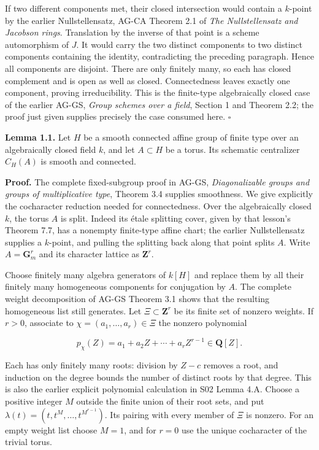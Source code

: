\documentclass[11pt,a4paper,openany]{report}
\newcounter{none}
\begin{document}
If two different components met, their closed intersection would contain a \(k\)-point by the earlier Nullstellensatz, AG-CA Theorem 2.1 of \emph{The Nullstellensatz and Jacobson rings}. Translation by the inverse of that point is a scheme automorphism of \(J\). It would carry the two distinct components to two distinct components containing the identity, contradicting the preceding paragraph. Hence all components are disjoint. There are only finitely many, so each has closed complement and is open as well as closed. Connectedness leaves exactly one component, proving irreducibility. This is the finite-type algebraically closed case of the earlier AG-GS, \emph{Group schemes over a field}, Section 1 and Theorem 2.2; the proof just given supplies precisely the case consumed here. \(\square\)

\textbf{Lemma 1.1.} Let \(H\) be a smooth connected affine group of finite type over an algebraically closed field \(k\), and let \(A\subset H\) be a torus. Its schematic centralizer \(C_H(A)\) is smooth and connected.

\textbf{Proof.} The complete fixed-subgroup proof in AG-GS, \emph{Diagonalizable groups and groups of multiplicative type}, Theorem 3.4 supplies smoothness. We give explicitly the cocharacter reduction needed for connectedness. Over the algebraically closed \(k\), the torus \(A\) is split. Indeed its étale splitting cover, given by that lesson's Theorem 7.7, has a nonempty finite-type affine chart; the earlier Nullstellensatz supplies a \(k\)-point, and pulling the splitting back along that point splits \(A\). Write \(A=\mathbf G_m^r\) and its character lattice as \(\mathbf Z^r\).

Choose finitely many algebra generators of \(k[H]\) and replace them by all their finitely many homogeneous components for conjugation by \(A\). The complete weight decomposition of AG-GS Theorem 3.1 shows that the resulting homogeneous list still generates. Let \(\Xi\subset\mathbf Z^r\) be its finite set of nonzero weights. If \(r>0\), associate to \(\chi=(a_1,\ldots,a_r)\in\Xi\) the nonzero polynomial

\[
p_\chi(Z)=a_1+a_2Z+\cdots+a_rZ^{r-1}\in\mathbf Q[Z].
\]

Each has only finitely many roots: division by \(Z-c\) removes a root, and induction on the degree bounds the number of distinct roots by that degree. This is also the earlier explicit polynomial calculation in S02 Lemma 4.A. Choose a positive integer \(M\) outside the finite union of their root sets, and put \(\lambda(t)=(t,t^M,\ldots,t^{M^{r-1}})\). Its pairing with every member of \(\Xi\) is nonzero. For an empty weight list choose \(M=1\), and for \(r=0\) use the unique cocharacter of the trivial torus.
\end{document}
